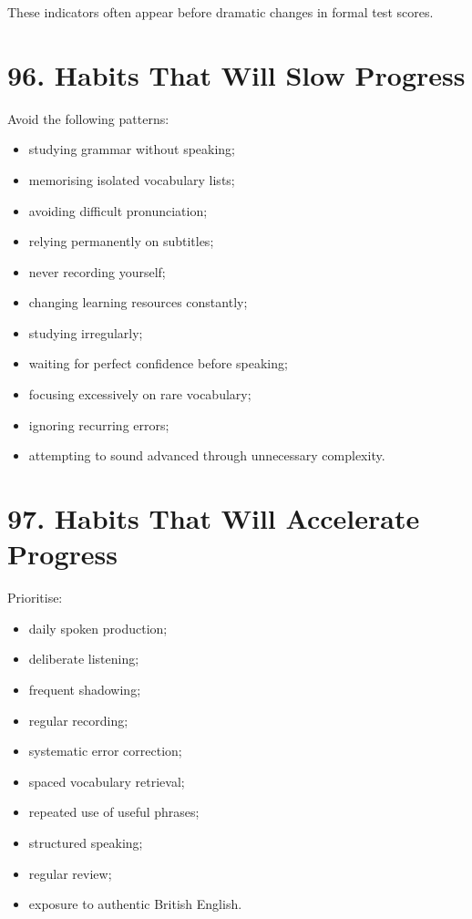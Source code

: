 These indicators often appear before dramatic changes in formal test scores.

\section*{96. Habits That Will Slow Progress}

Avoid the following patterns:

\begin{itemize}
    \item studying grammar without speaking;
    \item memorising isolated vocabulary lists;
    \item avoiding difficult pronunciation;
    \item relying permanently on subtitles;
    \item never recording yourself;
    \item changing learning resources constantly;
    \item studying irregularly;
    \item waiting for perfect confidence before speaking;
    \item focusing excessively on rare vocabulary;
    \item ignoring recurring errors;
    \item attempting to sound advanced through unnecessary complexity.
\end{itemize}

\section*{97. Habits That Will Accelerate Progress}

Prioritise:

\begin{itemize}
    \item daily spoken production;
    \item deliberate listening;
    \item frequent shadowing;
    \item regular recording;
    \item systematic error correction;
    \item spaced vocabulary retrieval;
    \item repeated use of useful phrases;
    \item structured speaking;
    \item regular review;
    \item exposure to authentic British English.
\end{itemize}

